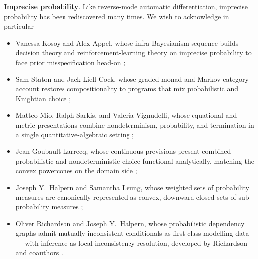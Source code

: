 
\item \textbf{Imprecise probability}. Like reverse-mode automatic
  differentiation, imprecise probability has been rediscovered many
  times. We wish to acknowledge in particular
  \begin{itemize}
    \item Vanessa Kosoy and Alex Appel, whose infra-Bayesianism
      sequence builds decision theory and reinforcement-learning
      theory on imprecise probability to face prior misspecification
      head-on \cite{kosoy20};
    \item Sam Staton and Jack Liell-Cock, whose graded-monad and
      Markov-category account restores compositionality to programs
      that mix probabilistic and Knightian choice \cite{liellcock24};
    \item Matteo Mio, Ralph Sarkis, and Valeria Vignudelli, whose
      equational and metric presentations combine nondeterminism,
      probability, and termination in a single quantitative-algebraic
      setting \cite{mio20};
    \item Jean Goubault-Larrecq, whose continuous previsions present
      combined probabilistic and nondeterministic choice
      functional-analytically, matching the convex powercones on the
      domain side \cite{goubaultlarrecq07,goubaultlarrecq08};
    \item Joseph Y.\ Halpern and Samantha Leung, whose weighted sets
      of probability measures are canonically represented as convex,
      downward-closed sets of sub-probability measures
      \cite{halpern13};
    \item Oliver Richardson and Joseph Y.\ Halpern, whose
      probabilistic dependency graphs admit mutually inconsistent
      conditionals as first-class modelling data \cite{richardson20}
      --- with inference as local inconsistency resolution, developed
      by Richardson and coauthors \cite{richardson26}.
  \end{itemize}
